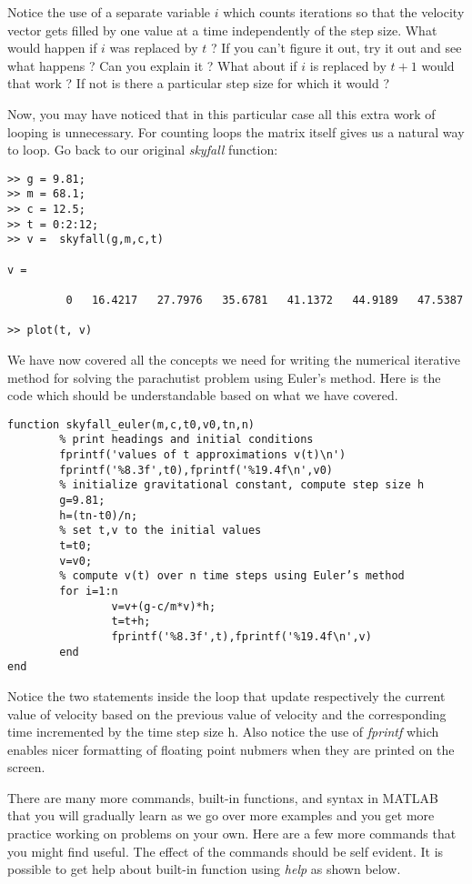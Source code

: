 \documentclass [titlepage,12pt,letter] {article}
\begin{document}
\noindent 

Notice the use of a separate variable $i$ which counts iterations so
that the velocity vector gets filled by one value at a time
independently of the step size. What would happen if $i$ was replaced
by $t$ ?  If you can't figure it out, try it out and see what happens
? Can you explain it ? What about if $i$ is replaced by $t+1$ would
that work ? If not is there a particular step size for which it would
?

Now, you may have noticed that in this particular case all this extra work
of looping is unnecessary. For counting loops the matrix itself gives us a natural
way to loop. Go back to our original {\it skyfall} function:

\begin{verbatim} 
>> g = 9.81;
>> m = 68.1;
>> c = 12.5;
>> t = 0:2:12; 
>> v =  skyfall(g,m,c,t) 

v =

         0   16.4217   27.7976   35.6781   41.1372   44.9189   47.5387

>> plot(t, v)
\end{verbatim} 

We have now covered all the concepts we need for writing the numerical
iterative method for solving the parachutist problem using Euler's
method. Here is the code which should be understandable based on what
we have covered.


\begin{verbatim} 
function skyfall_euler(m,c,t0,v0,tn,n)
        % print headings and initial conditions
        fprintf('values of t approximations v(t)\n')
        fprintf('%8.3f',t0),fprintf('%19.4f\n',v0)
        % initialize gravitational constant, compute step size h
        g=9.81;
        h=(tn-t0)/n;
        % set t,v to the initial values
        t=t0;
        v=v0;
        % compute v(t) over n time steps using Euler’s method
        for i=1:n
                v=v+(g-c/m*v)*h;
                t=t+h;
                fprintf('%8.3f',t),fprintf('%19.4f\n',v)
        end
end
\end{verbatim} 


\noindent 
Notice the two statements inside the loop that update respectively the
current value of velocity based on the previous value of velocity and
the corresponding time incremented by the time step size h. Also
notice the use of {\it fprintf} which enables nicer formatting of
floating point nubmers when they are printed on the screen.


There are many more commands, built-in functions, and syntax in MATLAB
that you will gradually learn as we go over more examples and you get
more practice working on problems on your own. Here are a few more
commands that you might find useful. The effect of the commands should
be self evident. It is possible to get help about built-in function
using {\it help} as shown below. 
\end{document}
